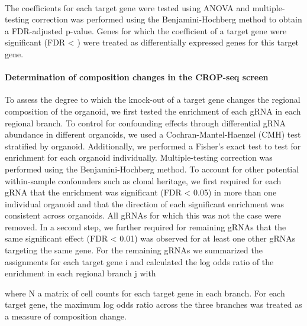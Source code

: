            ~
 
The coefficients for each target gene were tested using ANOVA and multiple-testing correction was performed using the Benjamini-Hochberg method to obtain a FDR-adjusted p-value. Genes for which the coefficient of a target gene were significant (FDR < ) were treated as differentially expressed genes for this target gene.
 
 
\paragraph{Determination of composition changes in the CROP-seq screen}
To assess the degree to which the knock-out of a target gene changes the regional composition of the organoid, we first tested the enrichment of each gRNA in each regional branch. To control for confounding effects through differential gRNA abundance in different organoids, we used a Cochran-Mantel-Haenzel (CMH) test stratified by organoid. Additionally, we performed a Fisher’s exact test to test for enrichment for each organoid individually. Multiple-testing correction was performed using the Benjamini-Hochberg method. To account for other potential within-sample confounders such as clonal heritage, we first required for each gRNA that the enrichment was significant (FDR < 0.05) in more than one individual organoid and that the direction of each significant enrichment was consistent across organoids. All gRNAs for which this was not the case were removed. In a second step, we further required for remaining gRNAs that the same significant effect (FDR < 0.01) was observed for at least one other gRNAs targeting the same gene. For the remaining gRNAs we summarized the assignments for each target gene i  and calculated the log odds ratio of the enrichment in each regional branch j with
 
                        
 
where N a matrix of cell counts for each target gene in each branch. For each target gene, the maximum log odds ratio across the three branches was treated as a measure of composition change.
 
 
